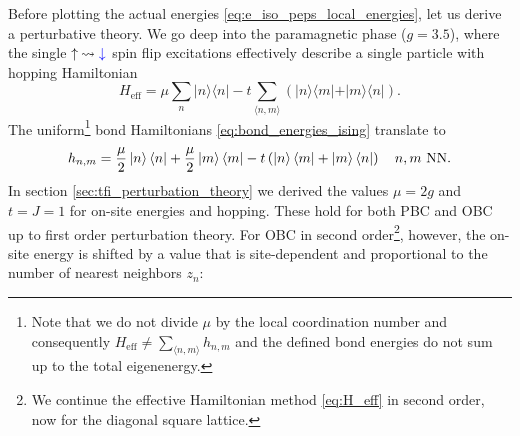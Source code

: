 \noindent Before plotting the actual energies \eqref{eq:e_iso_peps_local_energies}, let us derive a perturbative theory. We go deep into the paramagnetic phase ($g = 3.5$), where the single $\uparrow \: \leadsto \textcolor{blue}{\downarrow}$ spin flip excitations effectively describe a single particle with hopping Hamiltonian
 \begin{equation} \label{eq:H_ff}
 	H_{\text{eff}} =  
	\mu \sum_n \vert n \rangle \langle n \vert 
	- t \sum_{\langle n, m \rangle} \left( \vert n \rangle \langle m \vert + \vert m \rangle \langle n \vert \right).
 \end{equation}
The uniform\footnote{Note that we do not divide $\mu$ by the local coordination number and consequently $H_{\text{eff}} \neq \sum_{\langle n, m \rangle} h_{n,m}$ and the defined bond energies do not sum up to the total eigenenergy.} bond Hamiltonians \eqref{eq:bond_energies_ising} translate to
 \begin{equation} \label{eq:bond_hamiltonians}
	h_{n, m} =  \frac{\mu}{2} \ket{n} \bra{n} + \frac{\mu}{2} \ket{m} \bra{m} - t \left( \ket{n} \bra{m} + \ket{m} \bra{n} \right) \hspace{1em} n, m \text{ NN}.
\end{equation}
In section \ref{sec:tfi_perturbation_theory} we derived the values $\mu = 2g$ and $t = J = 1$ for on-site energies and hopping. These hold for both PBC and OBC up to first order perturbation theory. For OBC in second order\footnote{We continue the effective Hamiltonian method \eqref{eq:H_eff} in second order, now for the diagonal square lattice.}, however, the on-site energy is shifted by a value that is site-dependent and proportional to the number of nearest neighbors $z_n$:
